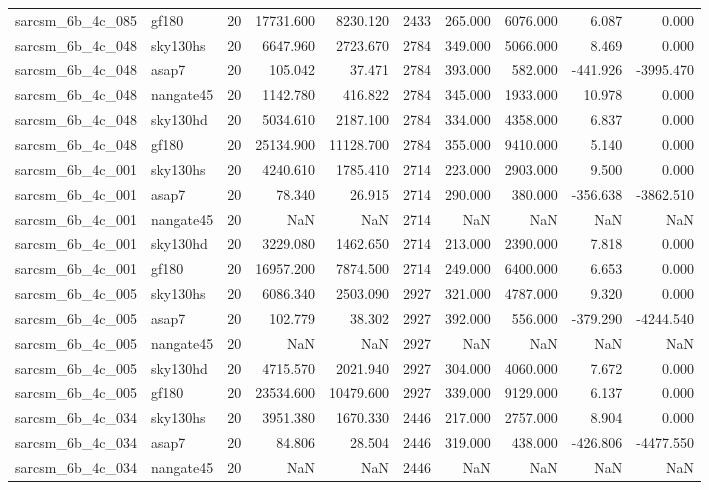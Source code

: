 \begin{tabular}{llrrrrrrrr}
sarcsm\_6b\_4c\_085 & gf180 & 20 & 17731.600 & 8230.120 & 2433 & 265.000 & 6076.000 & 6.087 & 0.000 \\
sarcsm\_6b\_4c\_048 & sky130hs & 20 & 6647.960 & 2723.670 & 2784 & 349.000 & 5066.000 & 8.469 & 0.000 \\
sarcsm\_6b\_4c\_048 & asap7 & 20 & 105.042 & 37.471 & 2784 & 393.000 & 582.000 & -441.926 & -3995.470 \\
sarcsm\_6b\_4c\_048 & nangate45 & 20 & 1142.780 & 416.822 & 2784 & 345.000 & 1933.000 & 10.978 & 0.000 \\
sarcsm\_6b\_4c\_048 & sky130hd & 20 & 5034.610 & 2187.100 & 2784 & 334.000 & 4358.000 & 6.837 & 0.000 \\
sarcsm\_6b\_4c\_048 & gf180 & 20 & 25134.900 & 11128.700 & 2784 & 355.000 & 9410.000 & 5.140 & 0.000 \\
sarcsm\_6b\_4c\_001 & sky130hs & 20 & 4240.610 & 1785.410 & 2714 & 223.000 & 2903.000 & 9.500 & 0.000 \\
sarcsm\_6b\_4c\_001 & asap7 & 20 & 78.340 & 26.915 & 2714 & 290.000 & 380.000 & -356.638 & -3862.510 \\
sarcsm\_6b\_4c\_001 & nangate45 & 20 & NaN & NaN & 2714 & NaN & NaN & NaN & NaN \\
sarcsm\_6b\_4c\_001 & sky130hd & 20 & 3229.080 & 1462.650 & 2714 & 213.000 & 2390.000 & 7.818 & 0.000 \\
sarcsm\_6b\_4c\_001 & gf180 & 20 & 16957.200 & 7874.500 & 2714 & 249.000 & 6400.000 & 6.653 & 0.000 \\
sarcsm\_6b\_4c\_005 & sky130hs & 20 & 6086.340 & 2503.090 & 2927 & 321.000 & 4787.000 & 9.320 & 0.000 \\
sarcsm\_6b\_4c\_005 & asap7 & 20 & 102.779 & 38.302 & 2927 & 392.000 & 556.000 & -379.290 & -4244.540 \\
sarcsm\_6b\_4c\_005 & nangate45 & 20 & NaN & NaN & 2927 & NaN & NaN & NaN & NaN \\
sarcsm\_6b\_4c\_005 & sky130hd & 20 & 4715.570 & 2021.940 & 2927 & 304.000 & 4060.000 & 7.672 & 0.000 \\
sarcsm\_6b\_4c\_005 & gf180 & 20 & 23534.600 & 10479.600 & 2927 & 339.000 & 9129.000 & 6.137 & 0.000 \\
sarcsm\_6b\_4c\_034 & sky130hs & 20 & 3951.380 & 1670.330 & 2446 & 217.000 & 2757.000 & 8.904 & 0.000 \\
sarcsm\_6b\_4c\_034 & asap7 & 20 & 84.806 & 28.504 & 2446 & 319.000 & 438.000 & -426.806 & -4477.550 \\
sarcsm\_6b\_4c\_034 & nangate45 & 20 & NaN & NaN & 2446 & NaN & NaN & NaN & NaN \\

\end{tabular}
